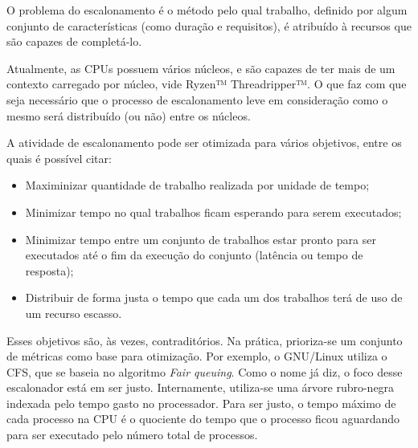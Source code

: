 

O problema do escalonamento é o método pelo qual trabalho, definido por algum conjunto de características (como duração e requisitos), é atribuído à recursos que são capazes de completá-lo. %

Atualmente, as \acrshort{CPU}s possuem vários núcleos, e são capazes de ter mais de um contexto carregado por núcleo, vide Ryzen™ Threadripper™\cite{Ryzen}. O que faz com que seja necessário que o processo de escalonamento leve em consideração como o mesmo será distribuído (ou não) entre os núcleos.

A atividade de escalonamento pode ser otimizada para vários objetivos, entre os quais é possível citar\cite{TANEMBAUM_SO}:
\begin{itemize}
	\item Maximinizar quantidade de trabalho realizada por unidade de tempo;
	\item Minimizar tempo no qual trabalhos ficam esperando para serem executados;
	\item Minimizar tempo entre um conjunto de trabalhos estar pronto para ser executados até o fim da execução do conjunto (latência ou tempo de resposta);
	\item Distribuir de forma justa o tempo que cada um dos trabalhos terá de uso de um recurso escasso.
\end{itemize}

Esses objetivos são, às vezes, contraditórios. Na prática, prioriza-se um conjunto de métricas como base para otimização. Por exemplo, o GNU/Linux utiliza o \acrfull{CFS}, que se baseia no algoritmo \textit{Fair queuing}. Como o nome já diz, o foco desse escalonador está em ser justo. Internamente, utiliza-se uma árvore rubro-negra indexada pelo tempo gasto no processador. Para ser justo, o tempo máximo de cada processo na \acrshort{CPU} é o quociente do tempo que o processo ficou aguardando para ser executado pelo número total de processos.

